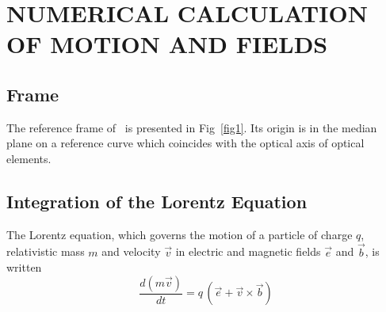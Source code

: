 \clearemptydoublepage

\section{NUMERICAL CALCULATION OF MOTION AND FIELDS}\label{sec2} %
\subsection{\zgoubi Frame} \label{sec2.1}   %

The reference frame of \zgou\  is presented in Fig~\ref{fig1}.  
Its origin is in the median plane on a reference curve which coincides with the optical 
axis of optical elements. 

\subsection{Integration of the Lorentz Equation} \label{sec2.2}%

The Lorentz equation, which governs the motion of a particle of charge $q$,  relativistic 
mass $m$ and velocity $\vec  v$ in electric and magnetic fields $\vec  e$ and $\vec  b$, is written 
\begin{equation}
\frac{d(m\vec  v)}{dt} = q\, (\vec  e + \vec  v \times  \vec  b)  \label{eq2-2-1}
\end{equation}

